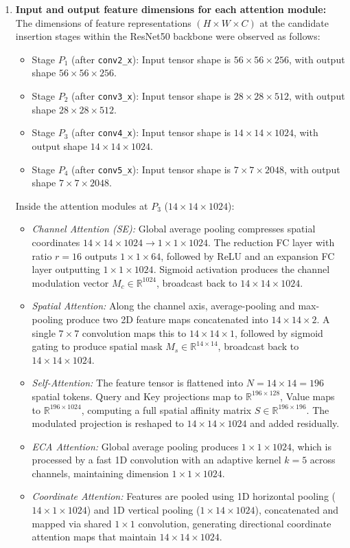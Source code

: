 \documentclass[10pt]{article}
\begin{document}
\begin{enumerate}

\item \textbf{Input and output feature dimensions for each attention module:}
The dimensions of feature representations $(H \times W \times C)$ at the candidate insertion stages within the ResNet50 backbone were observed as follows:
\begin{itemize}
\item Stage $P_1$ (after \texttt{conv2\_x}): Input tensor shape is $56 \times 56 \times 256$, with output shape $56 \times 56 \times 256$.
\item Stage $P_2$ (after \texttt{conv3\_x}): Input tensor shape is $28 \times 28 \times 512$, with output shape $28 \times 28 \times 512$.
\item Stage $P_3$ (after \texttt{conv4\_x}): Input tensor shape is $14 \times 14 \times 1024$, with output shape $14 \times 14 \times 1024$.
\item Stage $P_4$ (after \texttt{conv5\_x}): Input tensor shape is $7 \times 7 \times 2048$, with output shape $7 \times 7 \times 2048$.
\end{itemize}
Inside the attention modules at $P_3$ ($14 \times 14 \times 1024$):
\begin{itemize}
\item \textit{Channel Attention (SE):} Global average pooling compresses spatial coordinates $14 \times 14 \times 1024 \rightarrow 1 \times 1 \times 1024$. The reduction FC layer with ratio $r=16$ outputs $1 \times 1 \times 64$, followed by ReLU and an expansion FC layer outputting $1 \times 1 \times 1024$. Sigmoid activation produces the channel modulation vector $M_c \in \mathbb{R}^{1024}$, broadcast back to $14 \times 14 \times 1024$.
\item \textit{Spatial Attention:} Along the channel axis, average-pooling and max-pooling produce two 2D feature maps concatenated into $14 \times 14 \times 2$. A single $7\times7$ convolution maps this to $14 \times 14 \times 1$, followed by sigmoid gating to produce spatial mask $M_s \in \mathbb{R}^{14 \times 14}$, broadcast back to $14 \times 14 \times 1024$.
\item \textit{Self-Attention:} The feature tensor is flattened into $N = 14 \times 14 = 196$ spatial tokens. Query and Key projections map to $\mathbb{R}^{196 \times 128}$, Value maps to $\mathbb{R}^{196 \times 1024}$, computing a full spatial affinity matrix $S \in \mathbb{R}^{196 \times 196}$. The modulated projection is reshaped to $14 \times 14 \times 1024$ and added residually.
\item \textit{ECA Attention:} Global average pooling produces $1 \times 1 \times 1024$, which is processed by a fast 1D convolution with an adaptive kernel $k=5$ across channels, maintaining dimension $1 \times 1 \times 1024$.
\item \textit{Coordinate Attention:} Features are pooled using 1D horizontal pooling ($14 \times 1 \times 1024$) and 1D vertical pooling ($1 \times 14 \times 1024$), concatenated and mapped via shared $1\times1$ convolution, generating directional coordinate attention maps that maintain $14 \times 14 \times 1024$.
\end{itemize}


\end{enumerate}
\end{document}
